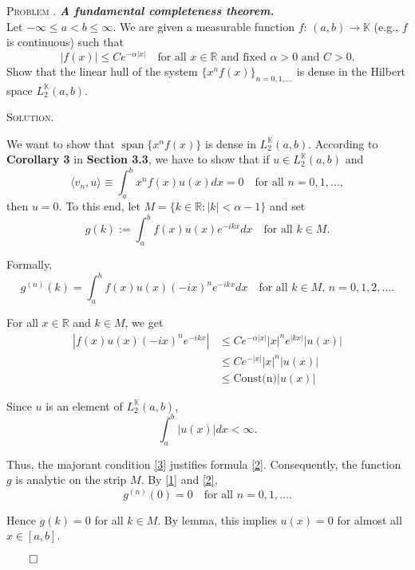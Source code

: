 \documentclass[12pt, a4paper, oneside]{ctexart}
\newcounter{problemname}
\newenvironment{problem}{\begin{framed}\stepcounter{problemname}\par\noindent\textsc{Problem \arabic{problemname}. }}{\end{framed}\par}
\newenvironment{solution}{%
	\par\noindent\textsc{Solution. }\ignorespaces
}{%
	\hfill$\qed$\par
}
\begin{document}
	\begin{problem}
		\textit{\textbf{A fundamental completeness theorem.}}\\
		Let $-\infty \leq a < b \leq \infty$. We are given a measurable function $f : \, (a, b) \to \mathbb{K}$ (e.g., $f$ is continuous) such that
		\[
		|f(x)| \leq C e^{-\alpha |x|} \quad \text{for all } x \in \mathbb{R} \text{ and fixed } \alpha > 0 \text{ and } C > 0.
		\]
		Show that the linear hull of the system $\{x^n f(x)\}_{n = 0, 1, \dots}$ is dense in the Hilbert space $L_2^\mathbb{K}(a, b)$.
	\end{problem}
	\begin{solution}
		We want to show that $\operatorname{span}\{x^n f(x)\}$ is dense in $L_2^\mathbb{K}(a, b)$. According to \textbf{Corollary 3} in \textbf{Section 3.3}, we have to show that if $u \in L_2^\mathbb{K}(a, b)$ and
		\[
		\langle v_n , u\rangle \equiv \int_{a}^b x^n f(x) u(x) dx = 0 \quad \text{for all } n = 0, 1, \ldots, \tag{1}\label{1}
		\]
		then $u = 0$. To this end, let $M = \{k\in\mathbb{R}:|k|<\alpha - 1\}$ and set
		\[
		g(k) := \int_{a}^b f(x) u(x) e^{-ikx} dx \quad \text{for all } k \in M .
		\]
		
		Formally,
		\[
		g^{(n)}(k) = \int_{a}^b f(x) u(x) (-ix)^n e^{-ikx} dx \quad \text{for all } k \in M, \, n = 0, 1, 2, \ldots. \tag{2}\label{2}
		\]
		
		For all $x \in \mathbb{R}$ and $k \in M$, we get
		\[
		\begin{aligned}
			\left| f(x) u(x) (-ix)^n e^{-ikx} \right| &\leq Ce^{-\alpha|x|} |x|^n e^{|kx|} |u(x)| \\
			&\leq Ce^{-|x|} |x|^n |u(x)|\\&\leq \text{Const(n)}|u(x)|
		\end{aligned}\tag{3}\label{3}
		\]
		
		
		
		Since $u$ is an element of $L_2^\mathbb{K}(a,b)$,
		\[
		\int_{a}^b \left| u(x) \right| dx < \infty.
		\]
		
		Thus, the majorant condition \eqref{3} justifies formula \eqref{2}. Consequently, the function $g$ is analytic on the strip $M$. By \eqref{1} and \eqref{2},
		\[
		g^{(n)}(0) = 0 \quad \text{for all } n = 0, 1, \ldots.
		\]
		
		Hence $g(k) = 0$ for all $k \in M$. By lemma,  this implies $u(x) = 0$ for almost all $x \in [a,b]$.
				
	\end{solution}
	
\end{document}
